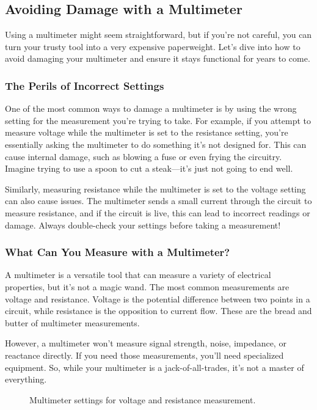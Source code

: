 \subsection{Avoiding Damage with a Multimeter}
\label{subsec:multimeter-damage}

Using a multimeter might seem straightforward, but if you’re not careful, you can turn your trusty tool into a very expensive paperweight. Let’s dive into how to avoid damaging your multimeter and ensure it stays functional for years to come.

\subsubsection*{The Perils of Incorrect Settings}
One of the most common ways to damage a multimeter is by using the wrong setting for the measurement you’re trying to take. For example, if you attempt to measure voltage while the multimeter is set to the resistance setting, you’re essentially asking the multimeter to do something it’s not designed for. This can cause internal damage, such as blowing a fuse or even frying the circuitry. Imagine trying to use a spoon to cut a steak—it’s just not going to end well.

Similarly, measuring resistance while the multimeter is set to the voltage setting can also cause issues. The multimeter sends a small current through the circuit to measure resistance, and if the circuit is live, this can lead to incorrect readings or damage. Always double-check your settings before taking a measurement!

\subsubsection*{What Can You Measure with a Multimeter?}
A multimeter is a versatile tool that can measure a variety of electrical properties, but it’s not a magic wand. The most common measurements are voltage and resistance. Voltage is the potential difference between two points in a circuit, while resistance is the opposition to current flow. These are the bread and butter of multimeter measurements.

However, a multimeter won’t measure signal strength, noise, impedance, or reactance directly. If you need those measurements, you’ll need specialized equipment. So, while your multimeter is a jack-of-all-trades, it’s not a master of everything.

\begin{figure}[h]
    \centering
    \caption{Multimeter settings for voltage and resistance measurement.}
    \label{fig:multimeter-settings}
\end{figure}

